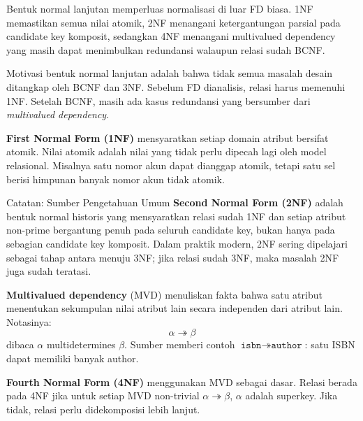 \begin{jawab}
Bentuk normal lanjutan memperluas normalisasi di luar FD biasa. 1NF memastikan semua nilai atomik, 2NF menangani ketergantungan parsial pada candidate key komposit, sedangkan 4NF menangani multivalued dependency yang masih dapat menimbulkan redundansi walaupun relasi sudah BCNF.
\end{jawab}

Motivasi bentuk normal lanjutan adalah bahwa tidak semua masalah desain ditangkap oleh BCNF dan 3NF. Sebelum FD dianalisis, relasi harus memenuhi 1NF. Setelah BCNF, masih ada kasus redundansi yang bersumber dari \textit{multivalued dependency}.

\textbf{First Normal Form (1NF)} mensyaratkan setiap domain atribut bersifat atomik. Nilai atomik adalah nilai yang tidak perlu dipecah lagi oleh model relasional. Misalnya satu nomor akun dapat dianggap atomik, tetapi satu sel berisi himpunan banyak nomor akun tidak atomik.

\begin{cmt}{Catatan: Sumber Pengetahuan Umum}{}
\textbf{Second Normal Form (2NF)} adalah bentuk normal historis yang mensyaratkan relasi sudah 1NF dan setiap atribut non-prime bergantung penuh pada seluruh candidate key, bukan hanya pada sebagian candidate key komposit. Dalam praktik modern, 2NF sering dipelajari sebagai tahap antara menuju 3NF; jika relasi sudah 3NF, maka masalah 2NF juga sudah teratasi.
\end{cmt}

\textbf{Multivalued dependency} (MVD) menuliskan fakta bahwa satu atribut menentukan sekumpulan nilai atribut lain secara independen dari atribut lain. Notasinya:
\begin{equation}
    \alpha \twoheadrightarrow \beta
    \label{eq:mvd}
\end{equation}
dibaca \(\alpha\) multidetermines \(\beta\). Sumber memberi contoh \(\texttt{isbn} \twoheadrightarrow \texttt{author}\): satu ISBN dapat memiliki banyak author.

\textbf{Fourth Normal Form (4NF)} menggunakan MVD sebagai dasar. Relasi berada pada 4NF jika untuk setiap MVD non-trivial \(\alpha \twoheadrightarrow \beta\), \(\alpha\) adalah superkey. Jika tidak, relasi perlu didekomposisi lebih lanjut.

